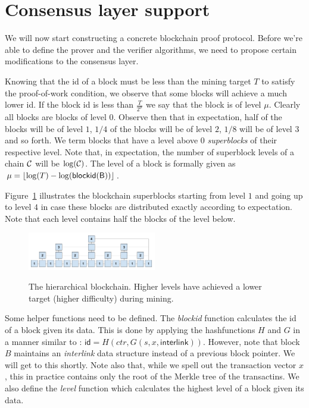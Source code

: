 \section{Consensus layer support}

We will now start constructing a concrete blockchain proof protocol. Before
we're able to define the prover and the verifier algorithms, we need to propose
certain modifications to the consensus layer.

Knowing that the id of a block must be less than the mining target $T$ to
satisfy the proof-of-work condition, we observe that some blocks will achieve a
much lower id. If the block id is less than $\frac{T}{2^\mu}$ we say that the
block is of level $\mu$. Clearly all blocks are blocks of level $0$. Observe
then that in expectation, half of the blocks will be of level $1$, $1/4$ of the
blocks will be of level $2$, $1/8$ will be of level $3$ and so forth. We term
blocks that have a level above 0 \textit{superblocks} of their respective
level. Note that, in expectation, the number of superblock levels of a chain
$\mathcal{C}$ will be $\log(\mathcal{C})$. The level of a block is formally given as $\mu
= \left \lfloor \log(T) - \log(\sf{blockid}(B)) \right \rfloor$.

Figure~\ref{fig.hierarchy} illustrates the blockchain superblocks starting from
level $1$ and going up to level $4$ in case these blocks are distributed
exactly according to expectation. Note that each level contains half the blocks
of the level below.

\begin{figure}[h]
    \caption{The hierarchical blockchain.
    Higher levels have achieved a lower target (higher difficulty) during mining.}
    \centering
    \includegraphics[width=0.5\textwidth,keepaspectratio]{figures/hierarchical-ledger.png}
    \label{fig.hierarchy}
\end{figure}

Some helper functions need to be defined. The \textit{blockid} function
calculates the id of a block given its data. This is done by applying the
hashfunctions $H$ and $G$ in a manner similar to \cite{backbone}:
$\textsf{id} = H(ctr, G(s, x, \textsf{interlink}))$. However, note that block
$B$ maintains an \textit{interlink} data structure instead of a previous block
pointer. We will get to this shortly. Note also that, while we spell out the
transaction vector $x$, this in practice contains only the root of the Merkle
tree of the transactins. We also define the \textit{level} function which
calculates the highest level of a block given its data.

